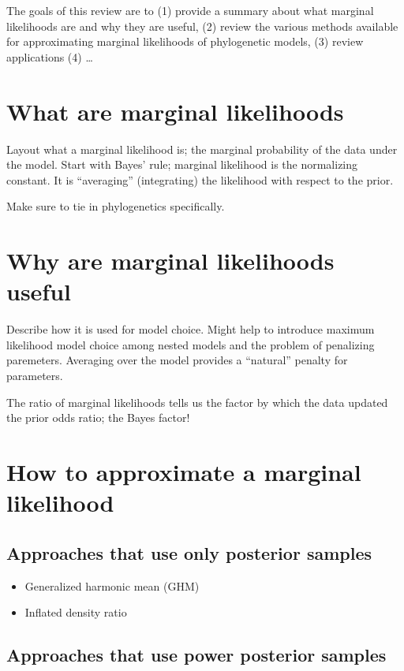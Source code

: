 The goals of this review are to
(1) provide a summary about what marginal likelihoods are and why they are
useful,
(2) review the various methods available for approximating marginal likelihoods
of phylogenetic models,
(3) review applications
(4) \ldots

\section{What are marginal likelihoods}

Layout what a marginal likelihood is; the marginal probability of the data
under the model. Start with Bayes' rule; marginal likelihood is the normalizing
constant. It is ``averaging'' (integrating) the likelihood with respect to the
prior.

Make sure to tie in phylogenetics specifically.

\section{Why are marginal likelihoods useful}

Describe how it is used for model choice. Might help to introduce maximum
likelihood model choice among nested models and the problem of penalizing
paremeters. Averaging over the model provides a ``natural'' penalty for
parameters.

The ratio of marginal likelihoods tells us the factor by which the data updated
the prior odds ratio; the Bayes factor!

\section{How to approximate a marginal likelihood}

\subsection{Approaches that use only posterior samples}

\begin{itemize}
    \item Generalized harmonic mean (GHM) \citep{Gelfand1994}
    \item Inflated density ratio \citep{Arima2012}
\end{itemize}

\subsection{Approaches that use power posterior samples}

